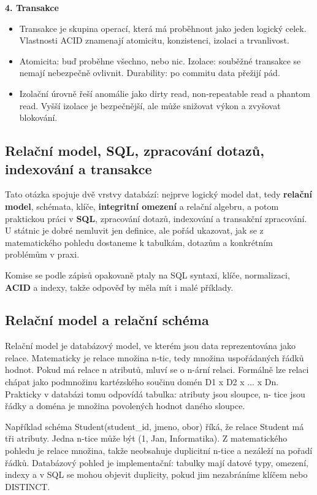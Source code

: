 \textbf{4. Transakce}
\begin{itemize}
  \item Transakce je skupina operací, která má proběhnout jako jeden logický celek. Vlastnosti ACID znamenají atomicitu, konzistenci, izolaci a trvanlivost.
  \item Atomicita: buď proběhne všechno, nebo nic. Izolace: souběžné transakce se nemají nebezpečně ovlivnit. Durability: po commitu data přežijí pád.
  \item Izolační úrovně řeší anomálie jako dirty read, non-repeatable read a phantom read. Vyšší izolace je bezpečnější, ale může snižovat výkon a zvyšovat blokování.
\end{itemize}

\subsection*{Relační model, SQL, zpracování dotazů, indexování a transakce}

Tato otázka spojuje dvě vrstvy databází: nejprve logický model dat, tedy \textbf{relační model}, schémata, klíče, \textbf{integritní omezení} a relační algebru, a potom praktickou práci v \textbf{SQL}, zpracování dotazů, indexování a transakční zpracování. U státnic je dobré nemluvit jen definice, ale pořád ukazovat, jak se z matematického pohledu dostaneme k tabulkám, dotazům a konkrétním problémům v praxi.

Komise se podle zápisů opakovaně ptaly na SQL syntaxi, klíče, normalizaci, \textbf{ACID} a indexy, takže odpověď by měla mít i malé příklady.

\subsection*{Relační model a relační schéma}

Relační model je databázový model, ve kterém jsou data reprezentována jako relace. Matematicky je relace množina n-tic, tedy množina uspořádaných řádků hodnot. Pokud má relace n atributů, mluví se o n-ární relaci. Formálně lze relaci chápat jako podmnožinu kartézského součinu domén D1 x D2 x ... x Dn. Prakticky v databázi tomu odpovídá tabulka: atributy jsou sloupce, n- tice jsou řádky a doména je množina povolených hodnot daného sloupce.

Například schéma Student(student\_id, jmeno, obor) říká, že relace Student má tři atributy. Jedna n-tice může být (1, Jan, Informatika). Z matematického pohledu je relace množina, takže neobsahuje duplicitní n-tice a nezáleží na pořadí řádků. Databázový pohled je implementační: tabulky mají datové typy, omezení, indexy a v SQL se mohou objevit duplicity, pokud jim nezabráníme klíčem nebo DISTINCT.


